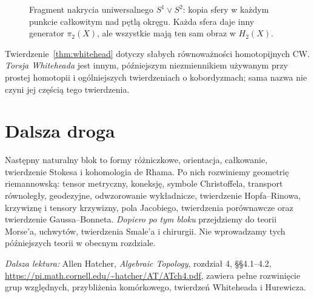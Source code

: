 \begin{figure}[!htbp]
\centering
{}
\caption{Fragment nakrycia uniwersalnego
$S^1\vee S^2$: kopia sfery w każdym
punkcie całkowitym nad pętlą okręgu.
Każda sfera daje inny generator
$\pi_2(X)$, ale wszystkie mają
ten sam obraz w $H_2(X)$.}
\label{fig:nakrycie-bukiet-sfer}
\end{figure}

\begin{uwaga}
Twierdzenie~\ref{thm:whitehead}
dotyczy słabych równoważności
homotopijnych CW.
\emph{Torsja Whiteheada}
jest innym, późniejszym
niezmiennikiem używanym
przy prostej homotopii
i ogólniejszych
twierdzeniach o
kobordyzmach; sama
nazwa nie czyni jej
częścią tego twierdzenia.
\end{uwaga}

\section*{Dalsza droga}
Następny naturalny blok to
formy różniczkowe,
orientacja, całkowanie,
twierdzenie Stokesa
i kohomologia de Rhama.
Po nich rozwiniemy
geometrię riemannowską:
tensor metryczny, koneksję,
symbole Christoffela,
transport równoległy,
geodezyjne, odwzorowanie
wykładnicze, twierdzenie
Hopfa--Rinowa, krzywiznę
i tensory krzywizny,
pola Jacobiego,
twierdzenia porównawcze
oraz twierdzenie
Gaussa--Bonneta.
\emph{Dopiero po tym bloku}
przejdziemy do teorii
Morse'a, uchwytów,
twierdzenia Smale'a
i chirurgii.
Nie wprowadzamy
tych późniejszych
teorii w obecnym rozdziale.

\par\smallskip
{\footnotesize\noindent\emph{Dalsza lektura:}
Allen Hatcher,
\emph{Algebraic Topology},
rozdział 4, §§4.1--4.2,
\url{https://pi.math.cornell.edu/~hatcher/AT/ATch4.pdf},
zawiera pełne rozwinięcie
grup względnych,
przybliżenia komórkowego,
twierdzeń Whiteheada
i Hurewicza.\par}
\clearpage
